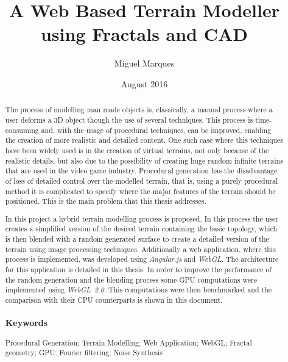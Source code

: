 \documentclass[12pt, oneside]{book}
\title{A Web Based Terrain Modeller using Fractals and CAD}
\author{Miguel Marques}
\date{August 2016}
\begin{document}
%
%

\frontmatter

\maketitle

\pagestyle{plain}

\begin{abstract}
	\doublespacing
	
    The process of modelling man made objects is, classically, a manual process where a user deforms a 3D object though the use of several techniques. This process is time-consuming and, with the usage of procedural techniques, can be improved, enabling the creation of more realistic and detailed content. One such case where this techniques have been widely used is in the creation of virtual terrains, not only because of the realistic details, but also due to the possibility of creating huge random infinite terrains that are used in the video game industry.
    Procedural generation has the disadvantage of loss of detailed control over the modelled terrain, that is, using a purely procedural method it is complicated to specify where the major features of the terrain should be positioned. This is the main problem that this thesis addresses.
    
    In this project a hybrid terrain modelling process is proposed. In this process the user creates a simplified version of the desired terrain containing the basic topology, which is then blended with a random generated surface to create a detailed version of the terrain using image processing techniques. Additionally a web application, where this process is implemented, was developed using \textit{Angular.js} and \mbox{\textit{WebGL}}. The architecture for this application is detailed in this thesis. In order to improve the performance of the random generation and the blending process some GPU computations were implemented using \mbox{\textit{WebGL 2.0}}. This computations were then benchmarked and the comparison with their CPU counterparts is shown in this document.
    
    

	\subsubsection*{Keywords}
	Procedural Generation; Terrain Modelling; Web Application; WebGL; Fractal geometry; GPU; Fourier filtering; Noise Synthesis
\end{abstract}
\end{document}
